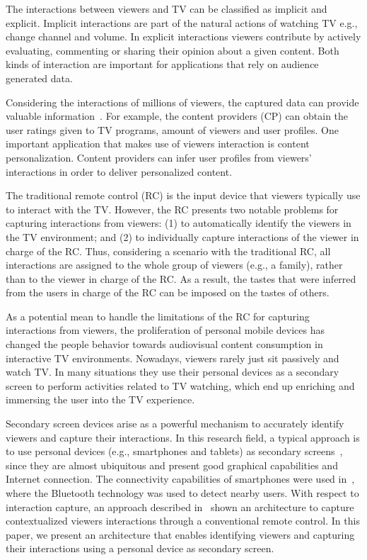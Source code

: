 \documentclass[conference,a4paper]{IEEEtran}
\begin{document}
The interactions between viewers and TV can be classified as implicit and explicit. Implicit interactions are part of the natural actions of watching TV e.g., change channel and volume. In explicit interactions viewers contribute by actively evaluating, commenting or sharing their opinion about a given content. Both kinds of interaction are important for applications that rely on audience generated data.

Considering the interactions of millions of viewers, the captured data can provide valuable information~\cite{Teixeira2010}. For example, the content providers (CP) can obtain the user ratings given to TV programs, amount of viewers and user profiles. One important application that makes use of viewers interaction is content personalization. Content providers can infer user profiles from viewers' interactions in order to deliver personalized content.

The traditional remote control (RC) is the input device that viewers typically use to interact with the TV. However, the RC presents two notable problems for capturing interactions from viewers: (1) to automatically identify the viewers in the TV environment; and (2) to individually capture interactions of the viewer in charge of the RC. Thus, considering a scenario with the traditional RC, all interactions are assigned to the whole group of viewers (e.g., a family), rather than to the viewer in charge of the RC. As a result, the tastes that were inferred from the users in charge of the RC can be imposed on the tastes of others.

As a potential mean to handle the limitations of the RC for capturing interactions from viewers, the proliferation of personal mobile devices has changed the people behavior towards audiovisual content consumption in interactive TV environments. Nowadays, viewers rarely just sit passively and watch TV. In many situations they use their personal devices as a secondary screen to perform activities related to TV watching, which end up enriching and immersing the user into the TV experience. 

Secondary screen devices arise as a powerful mechanism to accurately identify viewers and  capture their interactions. In this research field, a typical approach is to use personal devices (e.g., smartphones and tablets) as secondary screens~\cite{Courtois2012}, since they are almost ubiquitous and present good graphical capabilities and Internet connection. The connectivity capabilities of smartphones were used in~\cite{Cabarcos2011}, where the Bluetooth technology was used to detect nearby users. With respect to interaction capture, an approach described in~\cite{Teixeira2010} shown an architecture to capture contextualized viewers interactions through a conventional remote control. In this paper, we present an architecture that enables identifying viewers and capturing their interactions using a personal device as secondary screen. 
\end{document}
